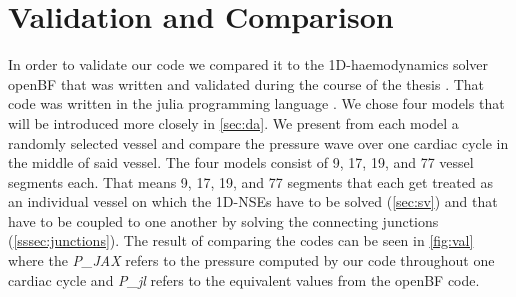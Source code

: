 \documentclass[a4paper, oneside]{discothesis}
\begin{document}
					\section{Validation and Comparison} \label{sec:val}
						In order to validate our code we compared it to the 1D-haemodynamics solver openBF \cite{openBF} that was written and validated during the course of the thesis \cite{melis2017gaussian}.
						That code was written in the julia programming language \cite{julia}.
						We chose four models that will be introduced more closely in \autoref{sec:da}.
						We present from each model a randomly selected vessel and compare the pressure wave over one cardiac cycle in the middle of said vessel.
						The four models consist of 9, 17, 19, and 77 vessel segments each.
						That means 9, 17, 19, and 77 segments that each get treated as an individual vessel on which the 1D-NSEs have to be solved (\autoref{sec:sv}) and that have to be coupled to one another by solving the connecting junctions (\autoref{sssec:junctions}).
						The result of comparing the codes can be seen in \autoref{fig:val} where the \emph{P\_JAX} refers to the pressure computed by our code throughout one cardiac cycle and \emph{P\_jl} refers to the equivalent values from the openBF code.
\end{document}
